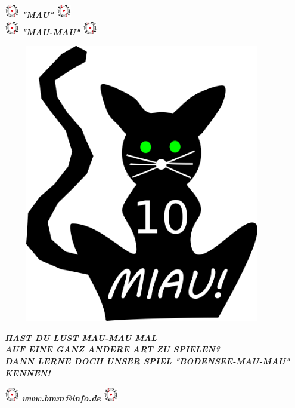 \documentclass{article}
\begin{document}
\begin{center}
\includegraphics[width=24px, height=24px]{photos/logo.png}
\huge{\textit{\textbf{"MAU"}}}
\includegraphics[width=24px, height=24px]{photos/logo.png}
 \\ \includegraphics[width=24px, height=24px]{photos/logo.png}
\huge{\textit{\textbf{"MAU-MAU"}}} \includegraphics[width=24px, height=24px]{photos/logo.png} 

\end{center}
\begin{center}
\includegraphics[width=460px, height=460px]{photos/cat.png}
\end{center}
\begin{center}
\huge{\textit{\textbf{HAST DU LUST MAU-MAU MAL \\
AUF EINE GANZ ANDERE ART ZU SPIELEN? \\
DANN LERNE DOCH UNSER SPIEL "BODENSEE-MAU-MAU" \\ KENNEN!}}} \\ 
\end{center}
\begin{center}
\includegraphics[width=24px, height=24px]{photos/logo.png}
\huge{\textit{\textbf{www.bmm@info.de}}}
\includegraphics[width=24px, height=24px]{photos/logo.png}
\end{center}



 \BgThispage
 \clearpage
\end{document}
